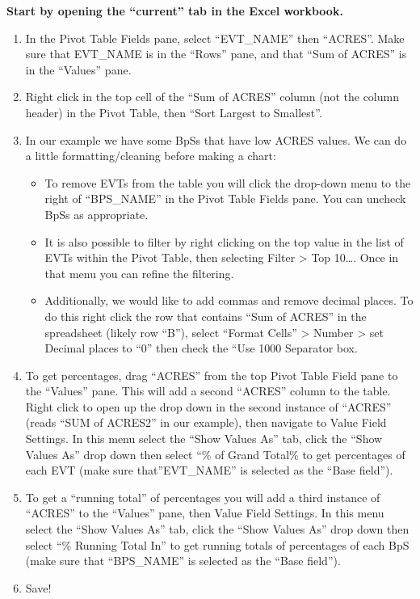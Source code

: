 \documentclass[
]{book}
\providecommand{\tightlist}{%
  \setlength{\itemsep}{0pt}\setlength{\parskip}{0pt}}
\begin{document}
\textbf{Start by opening the ``current'' tab in the Excel workbook.}

\begin{enumerate}
\def\labelenumi{\arabic{enumi}.}
\tightlist
\item
  In the Pivot Table Fields pane, select ``EVT\_NAME'' then ``ACRES''. Make sure that EVT\_NAME is in the ``Rows'' pane, and that ``Sum of ACRES'' is in the ``Values'' pane.\\
\item
  Right click in the top cell of the ``Sum of ACRES'' column (not the column header) in the Pivot Table, then ``Sort Largest to Smallest''.
\item
  In our example we have some BpSs that have low ACRES values. We can do a little formatting/cleaning before making a chart:

  \begin{itemize}
  \tightlist
  \item
    To remove EVTs from the table you will click the drop-down menu to the right of ``BPS\_NAME'' in the Pivot Table Fields pane. You can uncheck BpSs as appropriate.
  \item
    It is also possible to filter by right clicking on the top value in the list of EVTs within the Pivot Table, then selecting Filter \textgreater{} Top 10\ldots. Once in that menu you can refine the filtering.
  \item
    Additionally, we would like to add commas and remove decimal places. To do this right click the row that contains ``Sum of ACRES'' in the spreadsheet (likely row ``B''), select ``Format Cells'' \textgreater{} Number \textgreater{} set Decimal places to ``0'' then check the ``Use 1000 Separator box.
  \end{itemize}
\item
  To get percentages, drag ``ACRES'' from the top Pivot Table Field pane to the ``Values'' pane. This will add a second ``ACRES'' column to the table. Right click to open up the drop down in the second instance of ``ACRES'' (reads ``SUM of ACRES2'' in our example), then navigate to Value Field Settings. In this menu select the ``Show Values As'' tab, click the ``Show Values As'' drop down then select ``\% of Grand Total\% to get percentages of each EVT (make sure that''EVT\_NAME'' is selected as the ``Base field'').\\
\item
  To get a ``running total'' of percentages you will add a third instance of ``ACRES'' to the ``Values'' pane, then Value Field Settings. In this menu select the ``Show Values As'' tab, click the ``Show Values As'' drop down then select ``\% Running Total In'' to get running totals of percentages of each BpS (make sure that ``BPS\_NAME'' is selected as the ``Base field'').
\item
  Save!
\end{enumerate}
\end{document}
